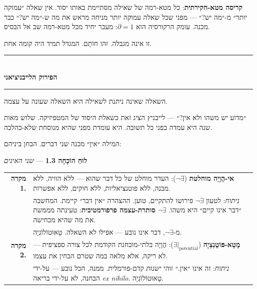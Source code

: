 \documentclass[10pt, openany, oneside]{book}
\renewcommand{\normalsize}{\fontsize{10}{13}\selectfont}
\begin{document}
\vspace{0.8em}

\noindent \textbf{קריסה מטא-חקירתית}: כל מטא-רמה של שאילה מסתיימת באותו יסוד. אין שאלה ״עמוקה יותר״ מ-״מה יש?״ — מפני שכל שאלה עמוקה יותר מניחה מראש את מה ש-״מה יש?״ כבר מכנה. עומק הרקורסיה הוא $\partial = 1$: מעבר יחיד מכל מטא-רמה שב אל הבסיס.

זו אינה מגבלה. זהו חוֹתָם. המגדל תמיד היה קומה אחת.

\vspace{1.5em}


\begin{center}
    \rule{0.3\textwidth}{0.4pt}\\[0.5em]
    {\normalsize\bfseries\textsc{הפירוק הלייבניציאני}}\\[0.3em]
    \rule{0.3\textwidth}{0.4pt}
\end{center}

\vspace{1em}

\noindent השאלה שאינה ניתנת לשאילה היא השאלה שעונה על עצמה.

״מדוע יש משהו ולא אין?״ — לייבניץ הציג זאת כשאלת היסוד של המטפיזיקה. שלוש מאות שנה היא עמדה בפני כל תשובה. היא עומדת מפני שהיא מנוסחת שלא-כהלכה.

המילה ״אין״ מכנה שני דברים. הבחן ביניהם:

\vspace{0.5em}

\textbf{לוּחַ הוֹכָחָה 1.3} --- \textit{שני האינים}

\vspace{0.5em}

\noindent\begin{tabular}{r p{}}
\textbf{מקרה 1.} & \textbf{אי-הֲוָיָה מוחלטת} ($\neg\exists$): העדר מוחלט של כל דבר שהוא — ללא הוויה, ללא מבנה, ללא פוטנציאליות, ללא חוקים, ללא אפשרות. \\[0.3em]
 & \textit{ניתוח}: לטעון $\neg\exists$ פירושו להתקיים, טוען. ההצהרה ״אין דבר״ קיימת. המחשבה ״דבר אינו קיים״ היא משהו. $\neg\exists$ \textbf{סותרת-עצמה פרפורמטיבית}: טעינתה מממשת את מה שהיא מכחישה. \\[0.3em]
 & מ-$\neg\exists$, דבר אינו נובע — אפילו לא השאלה. טָאוּטוֹלוֹגְיָה. \\[0.5em]
\textbf{מקרה 2.} & \textbf{מֶטָא-פּוֹטֶנְצְיָה} ($\exists|_{\text{potential}}$): הֲוָיָה בלתי-מובחנת הקודמת לכל צורה ספציפית — לא ריקה, אלא מלאה במה שטרם הבחין את עצמו. \\[0.3em]
 & \textit{ניתוח}: זה אינו ״אין.״ זוהי \textit{ישנוּת} קדם-פורמלית. ממנה, הכל נובע — על-ידי הבחנה, לא על-ידי בריאה \textit{ex nihilo}. טָאוּטוֹלוֹגְיָה. \\[0.3em]
\end{tabular}
\end{document}
